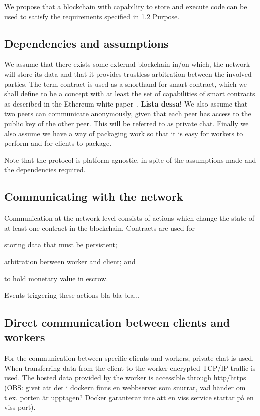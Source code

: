 We propose that a blockchain with capability to store and execute code can be used to satisfy the requirements specified in 1.2 Purpose.

\subsection{Dependencies and assumptions}
We assume that there exists some external blockchain in/on which, the network will store its data and that it provides trustless arbitration between the involved parties. The term contract is used as a shorthand for smart contract, which we shall define to be a concept with at least the set of capabilities of smart contracts as described in the Ethereum white paper~\cite{ethereum:white}. \textbf{Lista dessa!} We also assume that two peers can communicate anonymously, given that each peer has access to the public key of the other peer. This will be referred to as private chat. Finally we also assume we have a way of packaging work so that it is easy for workers to perform and for clients to package.

Note that the protocol is platform agnostic, in spite of the assumptions made and the dependencies required.

\subsection{Communicating with the network}
Communication at the network level consists of actions which change the state of at least one contract in the blockchain. Contracts are used for
\begin{inparaenum}
\item storing data that must be persistent;
\item arbitration between worker and client; and
\item to hold monetary value in escrow.
\end{inparaenum}
Events triggering these actions bla bla bla...

\subsection{Direct communication between clients and workers}
For the communication between specific clients and workers, private chat is used. When transferring data from the client to the worker encrypted TCP/IP traffic is used. The hosted data provided by the worker is accessible through http/https (OBS: givet att det i dockern finns en webbserver som snurrar, vad händer om t.ex. porten är upptagen? Docker garanterar inte att en viss service startar på en viss port).

